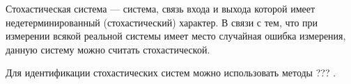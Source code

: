Стохастическая система --- система, связь входа и выхода которой имеет недетерминированный
(стохастический) характер. В связи с тем, что при измерении всякой реальной системы имеет место
случайная ошибка измерения, данную систему можно считать стохастической.

Для идентификации стохастических систем можно использовать методы ??? %
.








